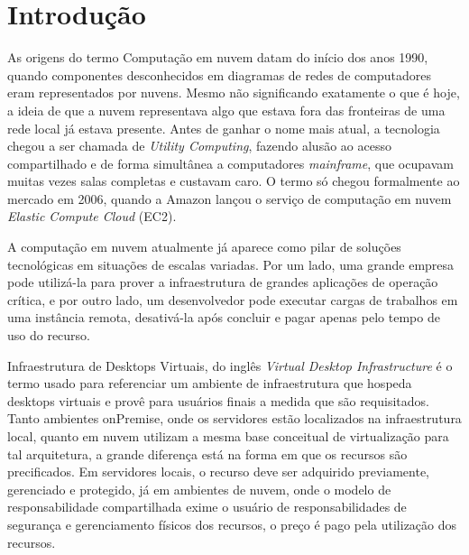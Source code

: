 
\chapter{Introdução}
\label{cap:introducao}

As origens do termo Computação em nuvem datam do início dos anos 1990, quando componentes desconhecidos em diagramas de redes de computadores eram representados por nuvens. Mesmo não significando exatamente o que é hoje, a ideia de que a nuvem representava algo que estava fora das fronteiras de uma rede local já estava presente. Antes de ganhar o nome mais atual, a tecnologia chegou a ser chamada de \textit{Utility Computing}, fazendo alusão ao acesso compartilhado e de forma simultânea a computadores \textit{mainframe}, que ocupavam muitas vezes salas completas e custavam caro. O termo só chegou formalmente ao mercado em 2006, quando a Amazon lançou o serviço de computação em nuvem \textit{Elastic Compute Cloud} (EC2). \citep{cloudcomputingcambridge}

A computação em nuvem atualmente já aparece como pilar de soluções tecnológicas em situações de
escalas variadas. Por um lado, uma grande empresa pode utilizá-la para prover a infraestrutura de
grandes aplicações de operação crítica, e por outro lado, um desenvolvedor pode executar cargas de
trabalhos em uma instância remota, desativá-la após concluir e pagar apenas pelo tempo de uso do
recurso. \citep{taurioncloud}

Infraestrutura de Desktops Virtuais, do inglês \textit{Virtual Desktop Infrastructure} é o termo usado para referenciar um ambiente de infraestrutura que hospeda \glspl{desktop} virtuais e provê para usuários finais a medida que são requisitados. Tanto ambientes \gls{onPremise}, onde os servidores estão localizados na infraestrutura local, quanto em nuvem utilizam a mesma base conceitual de virtualização para tal arquitetura, a grande diferença está na forma em que os recursos são precificados. Em servidores locais, o recurso deve ser adquirido previamente, gerenciado e protegido, já em ambientes de nuvem, onde o modelo de responsabilidade compartilhada exime o usuário de responsabilidades de segurança e gerenciamento físicos dos recursos, o preço é pago pela utilização dos recursos. \citep{cloudcomputingcambridge}

